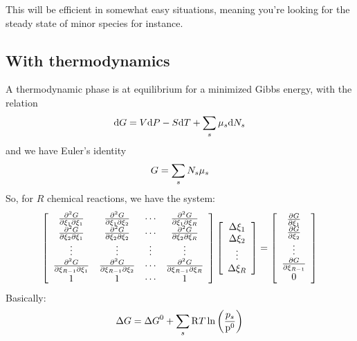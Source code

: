 This will be efficient in somewhat easy situations, meaning you're looking for the
steady state of minor species for instance.

\subsection{With thermodynamics}
A thermodynamic phase is at equilibrium for a minimized Gibbs energy, with
the relation
\begin{equation}
\dd\Gibbs = \Vol\dd\Press - \Entr\dd\Temp + \sum_s\chempot[s]\dd\Mol[s]
\end{equation}
and we have Euler's identity
\begin{equation}
\Gibbs = \sum_s \Mol[s]\chempot[s]
\end{equation}
So, for $R$ chemical reactions, we have the system:
\begin{equation}
\left[\begin{array}{cccc}
\ddoverddext{\Gibbs}{1}{1}   & \ddoverddext{\Gibbs}{1}{2}   & \cdots & \ddoverddext{\Gibbs}{1}{R} \\
\ddoverddext{\Gibbs}{2}{1}   & \ddoverddext{\Gibbs}{2}{2}   & \cdots & \ddoverddext{\Gibbs}{2}{R} \\
\vdots                       & \vdots                       & \vdots & \vdots                    \\
\ddoverddext{\Gibbs}{R-1}{1} & \ddoverddext{\Gibbs}{R-1}{2} & \cdots & \ddoverddext{\Gibbs}{R-1}{R} \\
1                            & 1                            & \cdots & 1\\
\end{array}\right]
\left[\begin{array}{c}
\Delta\ext[1]\\
\Delta\ext[2]\\
\vdots\\
\Delta\ext[R]\\
\end{array}\right]
=
\left[\begin{array}{c}
\doverdext[1]{\Gibbs}\\
\doverdext[2]{\Gibbs}\\
\vdots\\
\doverdext[R-1]{\Gibbs}\\
0
\end{array}\right]
\label{eq:matrixes_xi}
\end{equation}
Basically:
\begin{equation}
\DGibbs = \DGibbsZ + \sum_s\Rg \Temp \ln\left(\frac{p_s}{\pz}\right)
\end{equation}
